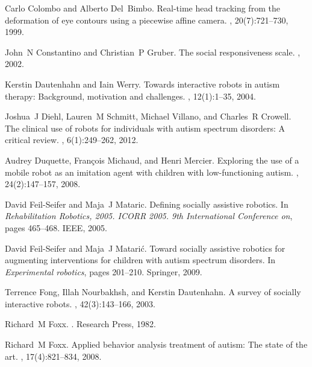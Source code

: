 \documentclass{ut-thesis}
\begin{document}
\begin{thebibliography}{100}
Carlo Colombo and Alberto Del~Bimbo.
\newblock Real-time head tracking from the deformation of eye contours using a
  piecewise affine camera.
, 20(7):721--730, 1999.

John~N Constantino and Christian~P Gruber.
\newblock The social responsiveness scale.
, 2002.

Kerstin Dautenhahn and Iain Werry.
\newblock Towards interactive robots in autism therapy: Background, motivation
  and challenges.
, 12(1):1--35, 2004.

Joshua~J Diehl, Lauren~M Schmitt, Michael Villano, and Charles~R Crowell.
\newblock The clinical use of robots for individuals with autism spectrum
  disorders: A critical review.
, 6(1):249--262, 2012.

Audrey Duquette, Fran{\c{c}}ois Michaud, and Henri Mercier.
\newblock Exploring the use of a mobile robot as an imitation agent with
  children with low-functioning autism.
, 24(2):147--157, 2008.

David Feil-Seifer and Maja~J Mataric.
\newblock Defining socially assistive robotics.
\newblock In {\em Rehabilitation Robotics, 2005. ICORR 2005. 9th International
  Conference on}, pages 465--468. IEEE, 2005.

David Feil-Seifer and Maja~J Matari{\'c}.
\newblock Toward socially assistive robotics for augmenting interventions for
  children with autism spectrum disorders.
\newblock In {\em Experimental robotics}, pages 201--210. Springer, 2009.

Terrence Fong, Illah Nourbakhsh, and Kerstin Dautenhahn.
\newblock A survey of socially interactive robots.
, 42(3):143--166, 2003.

Richard~M Foxx.
.
\newblock Research Press, 1982.

Richard~M Foxx.
\newblock Applied behavior analysis treatment of autism: The state of the art.
,
  17(4):821--834, 2008.


\end{thebibliography}
\end{document}

